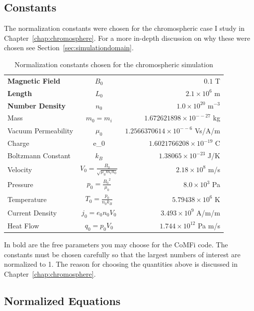 \documentclass[12pt,upcase]{umlthesis}
\begin{document}
\subsection{Constants}\label{sec:normconstants}

The normalization constants were chosen for the chromospheric case I study in Chapter~\ref{chap:chromosphere}. For a more in-depth discussion on why these were chosen see Section~\ref{sec:simulationdomain}.

\begin{table}[h]\label{tab:normalization}
\centering
\caption[Normalization Constants]{Normalization constants chosen for the chromospheric simulation}
\begin{tabular}[]{l  c  r}
	\toprule
	\textbf{Magnetic Field} & $B_0$ & $0.1$ T\\
	\textbf{Length} & $L_0$ & $2.1 \times 10^6$ m \\
	\textbf{Number Density} & $n_0$ & $1.0\times 10^{20}$ m$^{-3}$ \\
	Mass & $m_0 = m_i$ & $1.672621898\times 10^{-−27}$ kg \\
	Vacuum Permeability & $\mu_0$ & $1.2566370614\times 10^{-−6}$ Vs/A/m \\
	Charge & e_0 & $1.6021766208\times10^{-19}$ C \\
	Boltzmann Constant & $k_B$ & $1.38065\times10^{-23}$ J/K\\
	Velocity & $V_0=\frac{B_0}{\sqrt{\mu_0 m_i n_0}}$ & $2.18 \times 10^{8}$ m/s\\
	Pressure & $p_0= \frac{{B_0}^2}{\mu_0}$ & $8.0 \times 10^3$ Pa \\
	Temperature & $T_0 = \frac{p_0}{n_0 k_B} $ & $5.79438\times10^6$ K\\
	Current Density & $j_0 = e_0 n_0 V_0$ & $3.493\times10^9$ A/m/m \\
	Heat Flow & $q_0 = p_0 V_0$ & $1.744\times10^{12}$ Pa m/s \\
	\bottomrule
\end{tabular}
\end{table}

In bold are the free parameters you may choose for the CoMFi code. The constants must be chosen carefully so that the largest numbers of interest are normalized to 1. The reason for choosing the quantities above is discussed in Chapter~\ref{chap:chromosphere}.

\subsection{Normalized Equations}\label{sec:normequations}
\end{document}
